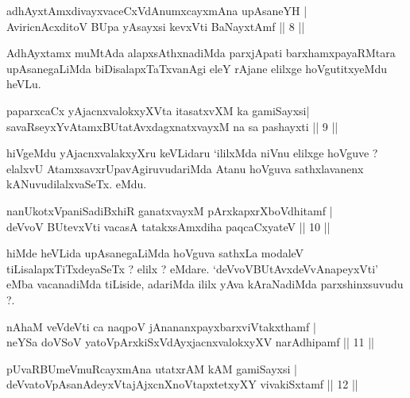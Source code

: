 \begin{shl}
adhAyxtAmxdivayxvaceCxVdAnumxcayxmAna upAsaneYH |\\
AviricnAcxditoV BUpa yAsayxsi kevxVti BaNayxtAmf \hfill || 8 || 
\end{shl}

\begin{artha}
AdhAyxtamx muMtAda alapxsAthxnadiMda parxjApati barxhamxpayaRMtara upAsanegaLiMda biDisalapxTaTxvanAgi eleY rAjane elilxge hoVgutitxyeMdu heVLu.
\end{artha}

\begin{shl}
paparxcaCx yAjacnxvalokxyXV\s ta itasatxvXM ka gamiSayxsi|\\
savaRseyxYvA\s \s tamxBUtatAvxdagxnatxvayxM na sa pashayxti \hfill || 9 || 
\end{shl}

\begin{artha}
hiVgeMdu yAjacnxvalakxyXru keVLidaru `ililxMda niVnu elilxge hoVguve ? elalxvU AtamxsavxrUpavAgiruvudariMda Atanu hoVguva sathxlavanenx kANuvudilalxvaSeTx. eMdu.
\end{artha}


\begin{shl}
nanUkotxVpaniSadiBxhiR ganatxvayxM pArxkapxrXboVdhitamf |\\
deVvoV BUtevxVti vacasA tatakxsAmxdiha paqcaCxyateV \hfill || 10 || 
\end{shl}

\begin{artha}
hiMde heVLida upAsanegaLiMda hoVguva sathxLa modaleV tiLisalapxTiTxdeyaSeTx ? elilx ? eMdare. `deVvoVBUtAvxdeVvAnapeyxVti' eMba vacanadiMda tiLiside, adariMda ililx yAva kAraNadiMda parxshinxsuvudu ?.
\end{artha}


\begin{shl}
nAhaM veVdeVti ca naqpoV jAnananxpayxbarxviVtakxthamf |\\
neYSa doVSoV yatoV\s pArxkiSxVdAyxjacnxvalokxyXV narAdhipamf \hfill || 11 || 
\end{shl}

\begin{shl}
pUvaRBUmeVmuRcayxmAna utatxrAM kAM gamiSayxsi |\\
deVvatoVpAsanAdeyxVtajAjxcnXnoVtapxtetxyXY vivakiSxtamf \hfill || 12 || 
\end{shl}

